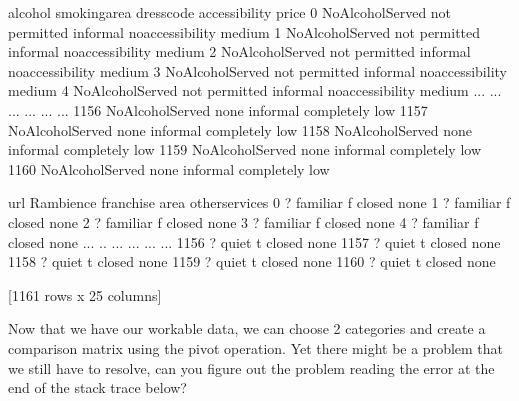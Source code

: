 \documentclass[letterpaper,10pt,english]{jupyterBook}
\begin{document}
\begin{sphinxVerbatim}[commandchars=\\\{\}]
                alcohol   smoking\PYGZus{}area dress\PYGZus{}code     accessibility   price  \PYGZbs{}
0     No\PYGZus{}Alcohol\PYGZus{}Served  not permitted   informal  no\PYGZus{}accessibility  medium   
1     No\PYGZus{}Alcohol\PYGZus{}Served  not permitted   informal  no\PYGZus{}accessibility  medium   
2     No\PYGZus{}Alcohol\PYGZus{}Served  not permitted   informal  no\PYGZus{}accessibility  medium   
3     No\PYGZus{}Alcohol\PYGZus{}Served  not permitted   informal  no\PYGZus{}accessibility  medium   
4     No\PYGZus{}Alcohol\PYGZus{}Served  not permitted   informal  no\PYGZus{}accessibility  medium   
...                 ...            ...        ...               ...     ...   
1156  No\PYGZus{}Alcohol\PYGZus{}Served           none   informal        completely     low   
1157  No\PYGZus{}Alcohol\PYGZus{}Served           none   informal        completely     low   
1158  No\PYGZus{}Alcohol\PYGZus{}Served           none   informal        completely     low   
1159  No\PYGZus{}Alcohol\PYGZus{}Served           none   informal        completely     low   
1160  No\PYGZus{}Alcohol\PYGZus{}Served           none   informal        completely     low   

     url Rambience franchise    area other\PYGZus{}services  
0      ?  familiar         f  closed           none  
1      ?  familiar         f  closed           none  
2      ?  familiar         f  closed           none  
3      ?  familiar         f  closed           none  
4      ?  familiar         f  closed           none  
...   ..       ...       ...     ...            ...  
1156   ?     quiet         t  closed           none  
1157   ?     quiet         t  closed           none  
1158   ?     quiet         t  closed           none  
1159   ?     quiet         t  closed           none  
1160   ?     quiet         t  closed           none  

[1161 rows x 25 columns]
\end{sphinxVerbatim}

\sphinxAtStartPar
Now that we have our workable data, we can choose 2 categories and create a comparison matrix using the pivot operation.
Yet there might be a problem that we still have to resolve, can you figure out the problem reading the error at the end of the stack trace below?

\begin{sphinxVerbatim}[commandchars=\\\{\}]
  
\end{sphinxVerbatim}
\end{document}
